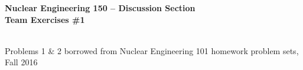 \documentclass{report}
\begin{document}
\begin{center}
\textbf{\large Nuclear Engineering 150 -- Discussion Section}\\ 
\textbf{Team Exercises \#1}

\-\\
{\small *Problems 1 \& 2 borrowed from Nuclear Engineering 101 homework problem sets, Fall 2016}
\end{center}


\newpage


\newpage


\newpage


\end{document}
